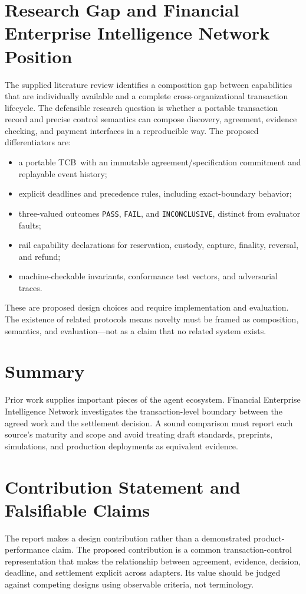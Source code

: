 \documentclass[12pt,a4paper,oneside]{report}
\newcommand{\TCB}{TCB}
\begin{document}
\section{Research Gap and Financial Enterprise Intelligence Network Position}
The supplied literature review identifies a composition gap between capabilities that are individually available and a complete cross-organizational transaction lifecycle. The defensible research question is whether a portable transaction record and precise control semantics can compose discovery, agreement, evidence checking, and payment interfaces in a reproducible way. The proposed differentiators are:
\begin{itemize}[leftmargin=*]
\item a portable \TCB\ with an immutable agreement/specification commitment and replayable event history;
\item explicit deadlines and precedence rules, including exact-boundary behavior;
\item three-valued outcomes \texttt{PASS}, \texttt{FAIL}, and \texttt{INCONCLUSIVE}, distinct from evaluator faults;
\item rail capability declarations for reservation, custody, capture, finality, reversal, and refund;
\item machine-checkable invariants, conformance test vectors, and adversarial traces.
\end{itemize}
These are proposed design choices and require implementation and evaluation. The existence of related protocols means novelty must be framed as composition, semantics, and evaluation—not as a claim that no related system exists.

\section{Summary}
Prior work supplies important pieces of the agent ecosystem. Financial Enterprise Intelligence Network investigates the transaction-level boundary between the agreed work and the settlement decision. A sound comparison must report each source's maturity and scope and avoid treating draft standards, preprints, simulations, and production deployments as equivalent evidence.

\section{Contribution Statement and Falsifiable Claims}
The report makes a design contribution rather than a demonstrated product-performance claim. The proposed contribution is a common transaction-control representation that makes the relationship between agreement, evidence, decision, deadline, and settlement explicit across adapters. Its value should be judged against competing designs using observable criteria, not terminology.
\end{document}

